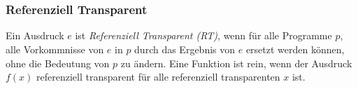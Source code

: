 	\section*{}
		\begin{frame}
			\frametitle{Referenziell Transparent}
			\begin{definition}
				Ein Ausdruck $e$ ist \emph{Referenziell Transparent (RT)},
				wenn für alle Programme $p$, alle Vorkommnisse von
				$e$ in $p$ durch das Ergebnis von $e$ ersetzt werden
				können, ohne die Bedeutung von $p$ zu ändern.
				Eine Funktion ist rein, wenn der Ausdruck $f(x)$ 			  
				referenziell transparent für alle referenziell
				transparenten $x$ ist.
			\end{definition} 
		\end{frame}